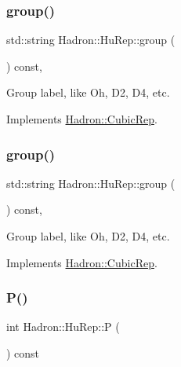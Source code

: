 \subsubsection{\texorpdfstring{group()}{group()}\hspace{0.1cm}{\footnotesize\ttfamily [2/3]}}
{\footnotesize\ttfamily std\+::string Hadron\+::\+Hu\+Rep\+::group (\begin{DoxyParamCaption}{ }\end{DoxyParamCaption}) const\hspace{0.3cm}{\ttfamily [inline]}, {\ttfamily [virtual]}}

Group label, like Oh, D2, D4, etc. 

Implements \mbox{\hyperlink{structHadron_1_1CubicRep_a0748f11ec87f387062c8e8981339a29c}{Hadron\+::\+Cubic\+Rep}}.

\mbox{\label{structHadron_1_1HuRep_ace31fc18f9795a65589ec7014517ac33}} 
\subsubsection{\texorpdfstring{group()}{group()}\hspace{0.1cm}{\footnotesize\ttfamily [3/3]}}
{\footnotesize\ttfamily std\+::string Hadron\+::\+Hu\+Rep\+::group (\begin{DoxyParamCaption}{ }\end{DoxyParamCaption}) const\hspace{0.3cm}{\ttfamily [inline]}, {\ttfamily [virtual]}}

Group label, like Oh, D2, D4, etc. 

Implements \mbox{\hyperlink{structHadron_1_1CubicRep_a0748f11ec87f387062c8e8981339a29c}{Hadron\+::\+Cubic\+Rep}}.

\mbox{\label{structHadron_1_1HuRep_a6cae988c8d4cbcc28b9573502f672900}} 
\subsubsection{\texorpdfstring{P()}{P()}\hspace{0.1cm}{\footnotesize\ttfamily [1/2]}}
{\footnotesize\ttfamily int Hadron\+::\+Hu\+Rep\+::P (\begin{DoxyParamCaption}{ }\end{DoxyParamCaption}) const\hspace{0.3cm}{\ttfamily [inline]}}

